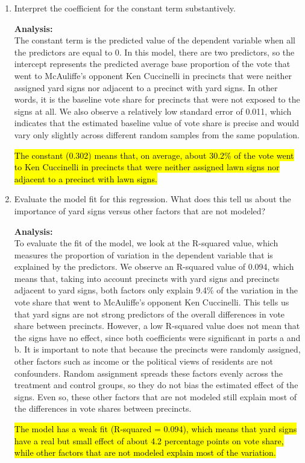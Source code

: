 \documentclass[12pt,letterpaper]{article}
\begin{document}
\begin{enumerate}
	\hl{There is sufficient evidence to reject the null hypothesis and can conclude that there is a linear relationship between the proportion of the vote that went to Ken Cuccinelli and being next to precincts with yard signs. }
	
	\item [(c)] Interpret the coefficient for the constant term substantively.
	
	
	
	\textbf{Analysis:}\\
	The constant term is the predicted value of the dependent variable when all the predictors are equal to 0. In this model, there are two predictors, so the intercept represents the predicted average base proportion of the vote that went to McAuliffe's opponent Ken Cuccinelli in precincts that were neither assigned yard signs nor adjacent to a precinct with yard signs. In other words, it is the baseline vote share for precincts that were not exposed to the signs at all. We also observe a relatively low standard error of 0.011, which indicates that the estimated baseline value of vote share is precise and would vary only slightly across different random samples from the same population. 
	
	\hl{The constant (0.302) means that, on average, about 30.2\% of the vote went to Ken Cuccinelli in precincts that were neither assigned lawn signs nor adjacent to a precinct with lawn signs. }
	
	\item [(d)] Evaluate the model fit for this regression.  What does this	tell us about the importance of yard signs versus other factors that are not modeled?
	
	
	
	\textbf{Analysis:}\\
	To evaluate the fit of the model, we look at the R-squared value, which measures the proportion of variation in the dependent variable that is explained by the predictors. We observe an R-squared value of 0.094, which means that, taking into account precincts with yard signs and precincts adjacent to yard signs, both factors only explain 9.4\% of the variation in the vote share that went to McAuliffe's opponent Ken Cuccinelli. This tells us that yard signs are not strong predictors of the overall differences in vote share between precincts. However, a low R-squared value does not mean that the signs have no effect, since both coefficients were significant in parts a and b. It is important to note that because the precincts were randomly assigned, other factors such as income or the political views of residents are not confounders. Random assignment spreads these factors evenly across the treatment and control groups, so they do not bias the estimated effect of the signs. Even so, these other factors that are not modeled still explain most of the differences in vote shares between precincts. 
	
	\hl{The model has a weak fit (R-squared = 0.094), which means that yard signs have a real but small effect of about 4.2 percentage points on vote share, while other factors that are not modeled explain most of the variation.}
	
\end{enumerate}  
\end{document}
